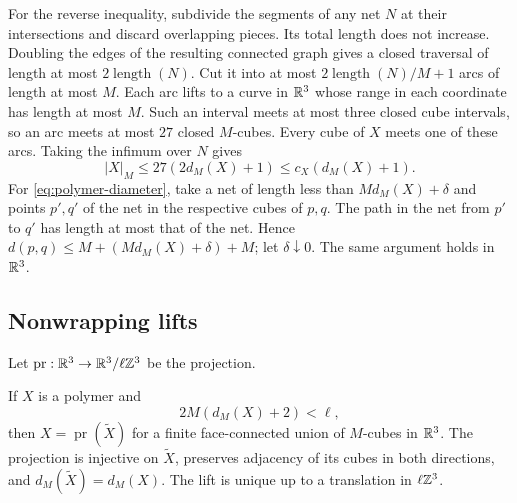 For the reverse inequality, subdivide the segments of any net $N$ at
their intersections and discard overlapping pieces. Its total length
does not increase. Doubling the edges of the resulting connected
graph gives a closed traversal of length at most
$2\operatorname{length}(N)$. Cut it into at most
$2\operatorname{length}(N)/M+1$ arcs of length at most $M$.
Each arc lifts to a curve in $\mathbb R^3$ whose range in each coordinate
has length at most $M$. Such an interval meets at most three closed
cube intervals, so an arc meets at most $27$ closed $M$-cubes.
Every cube of $X$ meets one of these arcs. Taking the infimum over
$N$ gives
\[
 |X|_M\le27(2d_M(X)+1)\le c_X(d_M(X)+1).
\]
For \eqref{eq:polymer-diameter}, take a net of length less than
$Md_M(X)+\delta$ and points $p',q'$ of the net in the respective
cubes of $p,q$. The path in the net from $p'$ to $q'$ has length
at most that of the net. Hence
$d(p,q)\le M+(Md_M(X)+\delta)+M$; let $\delta\downarrow0$.
The same argument holds in $\mathbb R^3$.

\subsection{Nonwrapping lifts}\label{subsec:polymer-lifts}

Let $\operatorname{pr}:\mathbb R^3\to\mathbb R^3/\ell\mathbb Z^3$ be the projection.
\begin{proposition}\label{prop:nonwrapping-polymer-lift}
If $X$ is a polymer and
\begin{equation}\label{eq:nonwrapping-polymer-condition}
 2M(d_M(X)+2)<\ell,
\end{equation}
then $X=\operatorname{pr}(\widetilde X)$ for a finite face-connected
union of $M$-cubes in $\mathbb R^3$. The projection is injective on
$\widetilde X$, preserves adjacency of its cubes in both directions,
and $d_M(\widetilde X)=d_M(X)$. The lift is unique up to a translation
in $\ell\mathbb Z^3$.
\end{proposition}


